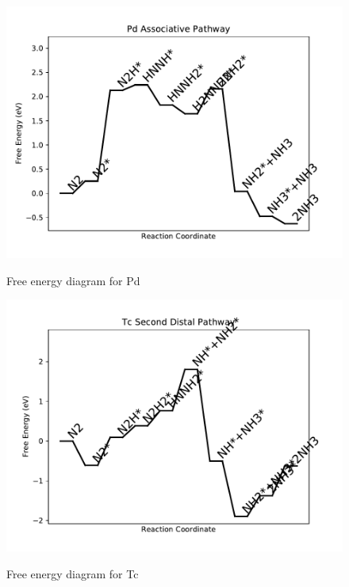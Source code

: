 \documentclass{article}
\begin{document}
\begin{figure}
\includegraphics[width=1\linewidth]{data/plots/Pd_associative.pdf}
\label{fig:Pd_associative}
\caption{Free energy diagram for Pd}
\end{figure}

\begin{figure}
\includegraphics[width=1\linewidth]{data/plots/Tc_distal_2.pdf}
\label{fig:Tc_distal_2}
\caption{Free energy diagram for Tc}
\end{figure}
\end{document}
